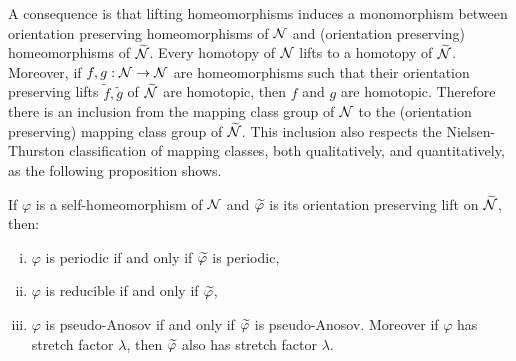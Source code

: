 A consequence is that lifting homeomorphisms induces a monomorphism between orientation preserving homeomorphisms of $\mathcal{N}$ and (orientation preserving) homeomorphisms of $\widetilde{\mathcal{N}}$.
Every homotopy of $\mathcal{N}$ lifts to a homotopy of $\widetilde{\mathcal{N}}$.
Moreover, if $f,g:\mathcal{N}\to\mathcal{N}$ are homeomorphisms such that their orientation preserving lifts $\widetilde{f},\widetilde{g}$ of $\widetilde{\mathcal{N}}$ are homotopic, then $f$ and $g$ are homotopic.
Therefore there is an inclusion from the mapping class group of $\mathcal{N}$ to the (orientation preserving) mapping class group of $\widetilde{\mathcal{N}}$.
This inclusion also respects the Nielsen-Thurston classification of mapping classes, both qualitatively, and quantitatively, as the following proposition shows.
\begin{prop}
  \label{prop:2}
  If $\varphi$ is a self-homeomorphism of $\mathcal{N}$ and $\widetilde{\varphi}$ is its orientation preserving lift on $\widetilde{\mathcal{N}}$, then:
  \begin{enumerate}[(i)]
  \item $\varphi$ is periodic if and only if $\widetilde{\varphi}$ is periodic,
  \item $\varphi$ is reducible if and only if $\widetilde{\varphi}$,
  \item $\varphi$ is pseudo-Anosov if and only if $\widetilde{\varphi}$ is pseudo-Anosov.  Moreover if $\varphi$ has stretch factor $\lambda$, then $\widetilde{\varphi}$ also has stretch factor $\lambda$.
  \end{enumerate}
\end{prop}
